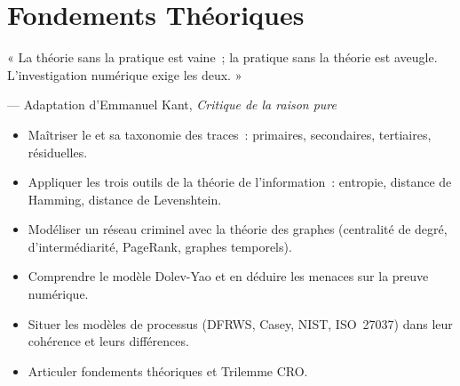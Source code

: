 
\chapter{Fondements Théoriques}
\label{chap:fond-theo}

\epigraph{%
    « La théorie sans la pratique est vaine~; la pratique sans la théorie
    est aveugle. L'investigation numérique exige les deux. »%
}{--- Adaptation d'Emmanuel Kant, \textit{Critique de la raison pure}}


\begin{boxobjectifs}
\begin{itemize}
    \item Maîtriser le  et
          sa taxonomie des traces~: primaires, secondaires, tertiaires,
          résiduelles.
    \item Appliquer les trois outils de la théorie de l'information~:
          entropie, distance de Hamming, distance de Levenshtein.
    \item Modéliser un réseau criminel avec la théorie des graphes
          (centralité de degré, d'intermédiarité, PageRank, graphes temporels).
    \item Comprendre le modèle Dolev-Yao et en déduire les menaces
          sur la preuve numérique.
    \item Situer les modèles de processus (DFRWS, Casey, NIST, ISO~27037)
          dans leur cohérence et leurs différences.
    \item Articuler fondements théoriques et Trilemme CRO.
\end{itemize}
\end{boxobjectifs}

\bigskip

